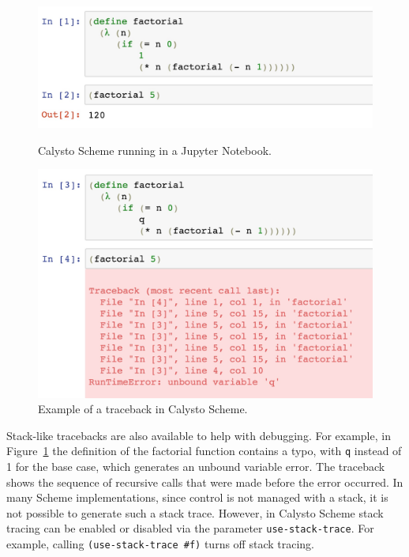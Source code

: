 \documentclass[acmsmall,screen,nonacm]{acmart}
\begin{document}

\begin{figure}[h]
\begin{minipage}{0.47\textwidth}
  \includegraphics[width=\textwidth]{factorial1.jpg}
  \caption{Calysto Scheme running in a Jupyter Notebook.}
  \label{fig:fact1}
\end{minipage}
\hspace{0.2in}
\begin{minipage}{0.47\textwidth}
  \includegraphics[width=\textwidth]{factorial2.jpg}
  \caption{Example of a traceback in Calysto Scheme.}
  \label{fig:fact2}
\end{minipage}
\end{figure}


Stack-like tracebacks are also available to help with debugging. For example,
in Figure~\ref{fig:fact2} the definition of the factorial function contains a
typo, with \texttt{q} instead of 1 for the base case, which generates an
unbound variable error. The traceback shows the sequence of recursive calls
that were made before the error occurred. In many Scheme implementations, since
control is not managed with a stack, it is not possible to generate such a
stack trace. However, in Calysto Scheme stack tracing can be enabled or
disabled via the parameter \texttt{use-stack-trace}. For example, calling
\texttt{(use-stack-trace~\#f)} turns off stack tracing.
\end{document}

